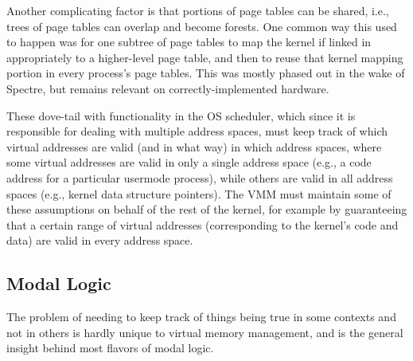 Another complicating factor is that portions of page tables can be shared, i.e., trees of page tables can overlap and
become forests. 
One common way this used to happen was for one subtree of page tables to map the kernel if linked in appropriately to 
a higher-level page table, and then to reuse that kernel mapping portion in every process's page tables. This was mostly 
phased out in the wake of Spectre, but remains relevant on correctly-implemented hardware.

These dove-tail with functionality in the OS scheduler, which since it is responsible for dealing with multiple 
address spaces, must keep track of which virtual addresses are valid (and in what way) in which address spaces, 
where some virtual addresses are valid in only a single address space (e.g., a code address for a particular usermode 
process), while others are valid in all address spaces (e.g., kernel data structure pointers). 
The VMM must maintain some of these assumptions on behalf of the rest of the kernel, for example by guaranteeing that 
a certain range of virtual addresses (corresponding to the kernel's code and data) are valid in every address space.

\subsection{Modal Logic}
\label{sec:backgroundonmodallogic}
The problem of needing to keep track of things being true in some contexts and not in others is hardly unique to virtual 
memory management, and is the general insight behind most flavors of modal logic.

